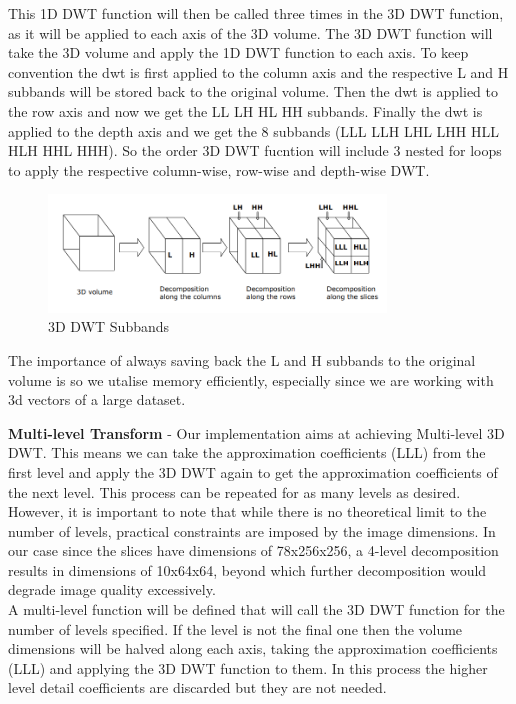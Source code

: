 \documentclass{article}
\begin{document}
This 1D DWT function will then be called three times in the 3D DWT function, as it will be applied to each axis of the 3D volume. The 3D DWT function will take the 3D volume and apply the 1D DWT function to each axis. To keep convention the dwt is first applied to the column axis and the respective L and H subbands will be stored back to the original volume. Then the dwt is applied to the row axis and now we get the LL LH HL HH subbands. Finally the dwt is applied to the depth axis and we get the 8 subbands (LLL LLH LHL LHH HLL HLH HHL HHH). So the order 3D DWT fucntion will include 3 nested for loops to apply the respective column-wise, row-wise and depth-wise DWT.\\

\begin{figure}
    \centering
    \includegraphics[width=0.8\textwidth]{assets/subbands.png}
    \caption{3D DWT Subbands \cite{Prochazka2011}}
    \label{fig3}
\end{figure}

The importance of always saving back the L and H subbands to the original volume is so we utalise memory efficiently, especially since we are working with 3d vectors of a large dataset.

\textbf{Multi-level Transform} - Our implementation aims at achieving Multi-level 3D DWT. This means we can take the approximation coefficients (LLL) from the first level and apply the 3D DWT again to get the approximation coefficients of the next level. This process can be repeated for as many levels as desired. However, it is important to note that while there is no theoretical limit to the number of levels, practical constraints are imposed by the image dimensions. In our case since the slices have dimensions of 78x256x256, a 4-level decomposition results in dimensions of 10x64x64, beyond which further decomposition would degrade image quality excessively.\\

A multi-level function will be defined that will call the 3D DWT function for the number of levels specified. If the level is not the final one then the volume dimensions will be halved along each axis, taking the approximation coefficients (LLL) and applying the 3D DWT function to them. In this process the higher level detail coefficients are discarded but they are not needed.\\
 
\end{document}
